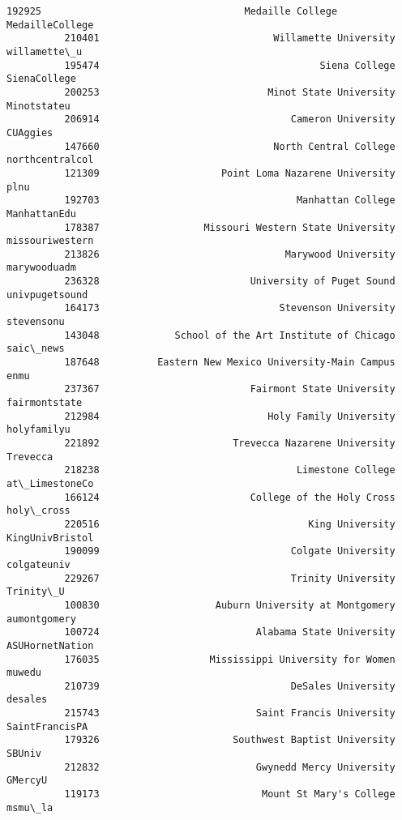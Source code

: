 \documentclass[11pt]{article}
\begin{document}
\begin{Verbatim}[commandchars=\\\{\}]
          192925                                   Medaille College  MedailleCollege   
          210401                              Willamette University     willamette\_u   
          195474                                      Siena College     SienaCollege   
          200253                             Minot State University      Minotstateu   
          206914                                 Cameron University         CUAggies   
          147660                              North Central College  northcentralcol   
          121309                     Point Loma Nazarene University             plnu   
          192703                                  Manhattan College     ManhattanEdu   
          178387                  Missouri Western State University  missouriwestern   
          213826                                Marywood University     marywooduadm   
          236328                          University of Puget Sound   univpugetsound   
          164173                               Stevenson University       stevensonu   
          143048             School of the Art Institute of Chicago        saic\_news   
          187648          Eastern New Mexico University-Main Campus             enmu   
          237367                          Fairmont State University    fairmontstate   
          212984                             Holy Family University      holyfamilyu   
          221892                       Trevecca Nazarene University         Trevecca   
          218238                                  Limestone College   at\_LimestoneCo   
          166124                          College of the Holy Cross       holy\_cross   
          220516                                    King University  KingUnivBristol   
          190099                                 Colgate University      colgateuniv   
          229267                                 Trinity University        Trinity\_U   
          100830                    Auburn University at Montgomery     aumontgomery   
          100724                           Alabama State University  ASUHornetNation   
          176035                   Mississippi University for Women           muwedu   
          210739                                 DeSales University          desales   
          215743                           Saint Francis University   SaintFrancisPA   
          179326                       Southwest Baptist University           SBUniv   
          212832                           Gwynedd Mercy University          GMercyU   
          119173                            Mount St Mary's College          msmu\_la   

\end{Verbatim}
\end{document}
